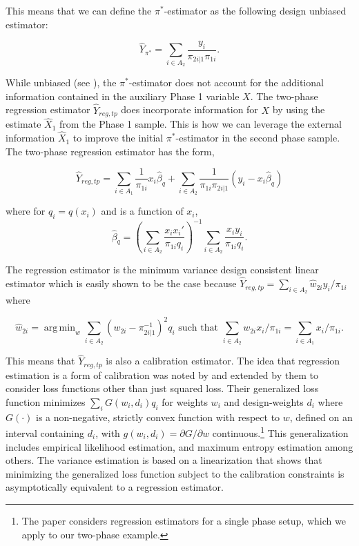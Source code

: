 \documentclass[12pt]{article}
\DeclareMathOperator*{\argmin}{arg\,min}
\begin{document}
This means that we can define the $\pi^*$-estimator as the following design
unbiased estimator:

$$ \hat Y_{\pi^*} = \sum_{i \in A_2} \frac{y_i}{\pi_{2i | 1} \pi_{1i}}.$$

While unbiased (see \cite{kim2024statistics}), the $\pi^*$-estimator
does not account for the additional information contained in the auxiliary Phase
1 variable $X$. The two-phase regression estimator $\hat Y_{reg, tp}$ does incorporate 
information for $X$ by using the estimate $\hat X_1$ from the Phase 1 sample.
This is how we can leverage the external information $\hat X_1$ to improve the
initial $\pi^*$-estimator in the second phase sample.
The two-phase regression estimator has the form,

$$ \hat Y_{reg, tp} 
= \sum_{i \in A_1} \frac{1}{\pi_{1i}} x_i \hat \beta_q+ \sum_{i \in A_2}
\frac{1}{\pi_{1i}\pi_{2i|1}} (y_i - x_i \hat \beta_q)$$

where for $q_i = q(x_i)$ and is a function of $x_i$,
$$
\hat \beta_q = \left(\sum_{i \in A_2} 
  \frac{x_i x_i'}{\pi_{1i} q_i}\right)^{-1} 
\sum_{i \in A_2} \frac{x_i y_i}{\pi_{1i} q_i}.$$ 

The regression estimator is the minimum variance design consistent linear
estimator which is easily shown to be the case because $\hat Y_{reg, tp} =
\sum_{i \in A_2} \hat w_{2i} y_i / \pi_{1i}$ where 

$$\hat w_{2i} = \argmin_{w} \sum_{i \in A_2} (w_{2i} - \pi_{2i|1}^{-1})^2 q_i \text{ such
that } \sum_{i \in A_2} w_{2i} x_i / \pi_{1i} = \sum_{i \in A_1} x_i / \pi_{1i}.$$

This means that $\hat Y_{reg, tp}$ is also a calibration estimator. The idea
that regression estimation is a form of calibration was noted by
\cite{deville1992calibration} and extended by them to consider loss functions
other than just squared loss. Their generalized loss function minimizes
$\sum_i G(w_i, d_i)q_i$ for weights $w_i$ and design-weights $d_i$ where
$G(\cdot)$ is a non-negative, strictly convex function with respect to $w$,
defined on an interval containing $d_i$, with $g(w_i, d_i) = \partial G /
\partial w$ continuous.\footnote{The \cite{deville1992calibration} paper
considers regression estimators for a single phase setup, which we apply to our
two-phase example.} This
generalization includes empirical likelihood estimation, and maximum entropy
estimation among others. The variance estimation is based on a linearization
that shows that minimizing the generalized loss function subject to the
calibration constraints is asymptotically equivalent to a regression estimator.
\end{document}

